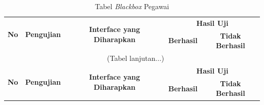 \begin{enumerate}
{		\begin{longtable}{p{0.5cm} p{4cm} p{4cm} p{0.5cm} p{1cm}}
			\caption{Tabel \textit{Blackbox} Pegawai}
			\label{blackboxtesting4}\\ 
			\hline
			\multicolumn{1}{c}{\multirow{2}{*}{\textbf{No}}} & \multicolumn{1}{c}{\multirow{2}{*}{\textbf{Pengujian}}} & \multicolumn{1}{c}{\multirow{2}{*}{\textbf{Interface yang Diharapkan}}} & \multicolumn{2}{c}{\textbf{Hasil Uji}} \\ \cline{4-5} 
			\multicolumn{1}{c}{} & \multicolumn{1}{c}{} & \multicolumn{1}{c}{} & \multicolumn{1}{c}{\textbf{Berhasil}} & \multicolumn{1}{c}{\textbf{Tidak Berhasil}} \\ \hline
			\endfirsthead
			\multicolumn{5}{c}{\tablename\ \thetable\ \namaTabel \space (Tabel
				lanjutan...)} \\
			\hline
			\multicolumn{1}{c}{\multirow{2}{*}{\textbf{No}}} & \multicolumn{1}{c}{\multirow{2}{*}{\textbf{Pengujian}}} & \multicolumn{1}{c}{\multirow{2}{*}{\textbf{Interface yang Diharapkan}}} & \multicolumn{2}{c}{\textbf{Hasil Uji}} \\ \cline{4-5} 
			\multicolumn{1}{c}{} & \multicolumn{1}{c}{} & \multicolumn{1}{c}{} & \multicolumn{1}{c}{\textbf{Berhasil}} & \multicolumn{1}{c}{\textbf{Tidak Berhasil}} \\ \hline
			\endhead
			

\end{longtable}}
\end{enumerate}
